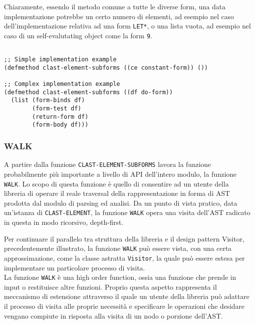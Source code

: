 Chiaramente, essendo il metodo comune a tutte le diverse form, una data
implementazione potrebbe un certo numero di elementi, ad esempio nel caso
dell'implementazione relativa ad una form \texttt{LET*}, o una lista vuota, ad
esempio nel caso di un self-evalutating object come la form \texttt{9}.

\begin{lstlisting}[caption=Esempi di implementazione del metodo \texttt
{CLAST-ELEMENT-SUBFORMS}]

;; Simple implementation example
(defmethod clast-element-subforms ((ce constant-form)) ())

;; Complex implementation example
(defmethod clast-element-subforms ((df do-form))
  (list (form-binds df)
        (form-test df)
        (return-form df)
        (form-body df)))

\end{lstlisting}

\subsubsection{WALK}

A partire dalla funzione \texttt{CLAST-ELEMENT-SUBFORMS} lavora la funzione
probabilmente più importante a livello di API dell'intero modulo, la funzione
\texttt{WALK}. Lo scopo di questa funzione è quello di consentire ad un utente
della libreria di operare il reale traversal della rappresentazione in forma di
AST prodotta dal modulo di parsing ed analisi. Da un punto di vista pratico,
data un'istanza di \texttt{CLAST-ELEMENT}, la funzione \texttt{WALK} opera una
visita dell'AST radicato in questa in modo ricorsivo, depth-first.

Per continuare il parallelo tra struttura della libreria e il design pattern
Visitor, precedentemente illustrato, la funzione \texttt{WALK} può essere
vista, con una certa approssimazione, come la classe astratta
\texttt{Visitor}, la quale può essere estesa per implementare un particolare
processo di visita.\\


La funzione \texttt{WALK} è una high order function, ossia una funzione che
prende in input o restituisce altre funzioni. Proprio questa aspetto
rappresenta il meccanismo di estensione attraverso il quale un utente della
libreria può adattare il processo di visita alle proprie necessità e
specificare le operazioni che desidare vengano compiute in risposta alla
visita di un nodo o porzione dell'AST.

